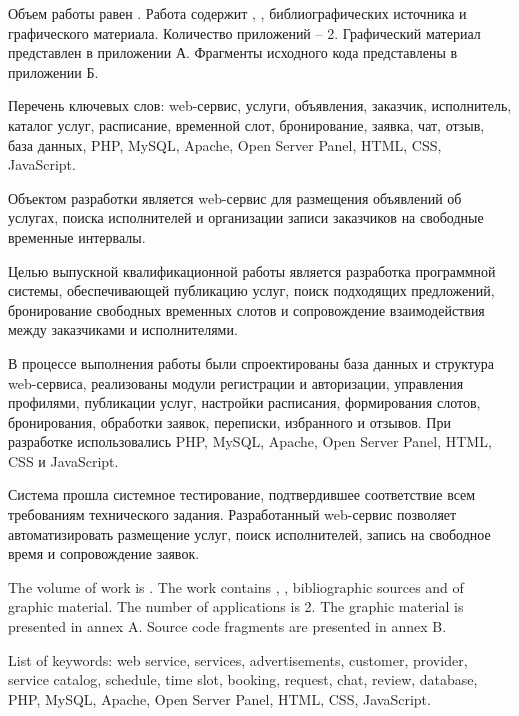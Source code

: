 
Объем работы равен . Работа содержит , ,  библиографических источника и  графического материала. Количество приложений – 2. Графический материал представлен в приложении А. Фрагменты исходного кода представлены в приложении Б.

Перечень ключевых слов: web-сервис, услуги, объявления, заказчик, исполнитель, каталог услуг, расписание, временной слот, бронирование, заявка, чат, отзыв, база данных, PHP, MySQL, Apache, Open Server Panel, HTML, CSS, JavaScript.

Объектом разработки является web-сервис для размещения объявлений об услугах, поиска исполнителей и организации записи заказчиков на свободные временные интервалы.

Целью выпускной квалификационной работы является разработка программной системы, обеспечивающей публикацию услуг, поиск подходящих предложений, бронирование свободных временных слотов и сопровождение взаимодействия между заказчиками и исполнителями.

В процессе выполнения работы были спроектированы база данных и структура web-сервиса, реализованы модули регистрации и авторизации, управления профилями, публикации услуг, настройки расписания, формирования слотов, бронирования, обработки заявок, переписки, избранного и отзывов. При разработке использовались PHP, MySQL, Apache, Open Server Panel, HTML, CSS и JavaScript.

Система прошла системное тестирование, подтвердившее соответствие всем требованиям технического задания. Разработанный web-сервис позволяет автоматизировать размещение услуг, поиск исполнителей, запись на свободное время и сопровождение заявок.


The volume of work is . The work contains , ,  bibliographic sources and  of graphic material. The number of applications is 2. The graphic material is presented in annex A. Source code fragments are presented in annex B.

List of keywords: web service, services, advertisements, customer, provider, service catalog, schedule, time slot, booking, request, chat, review, database, PHP, MySQL, Apache, Open Server Panel, HTML, CSS, JavaScript.

